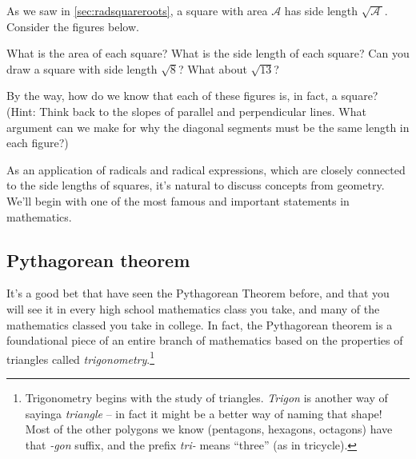 \begin{boxexplore}[Squarea]
As we saw in \cref{sec:radsquareroots}, a square with area $\mathcal{A}$ has side length $\sqrt{\!\mathcal{A}\,}$. Consider the figures below.

\begin{center}
\end{center}

What is the area of each square? What is the side length of each square? Can you draw a square with side length $\sqrt{8}$? What about $\sqrt{13}$?

By the way, how do we know that each of these figures is, in fact, a square? (Hint: Think back to the slopes of parallel and perpendicular lines. What argument can we make for why the diagonal segments must be the same length in each figure?)
\end{boxexplore}

As an application of radicals and radical expressions, which are closely connected to the side lengths of squares, it's natural to discuss concepts from geometry. We'll begin with one of the most famous and important statements in mathematics.

\subsection{{P}ythagorean theorem}

It's a good bet that have seen the Pythagorean Theorem before, and that you will see it in every high school mathematics class you take, and many of the mathematics classed you take in college. In fact, the Pythagorean theorem is a foundational piece of an entire branch of mathematics based on the properties of triangles called \textit{trigonometry}.\footnote{Trigonometry begins with the study of triangles. \textit{Trigon} is another way of sayinga \textit{triangle} -- in fact it might be a better way of naming that shape! Most of the other polygons we know (pentagons, hexagons, octagons) have that \textit{-gon} suffix, and the prefix \textit{tri-} means ``three'' (as in tricycle).}

